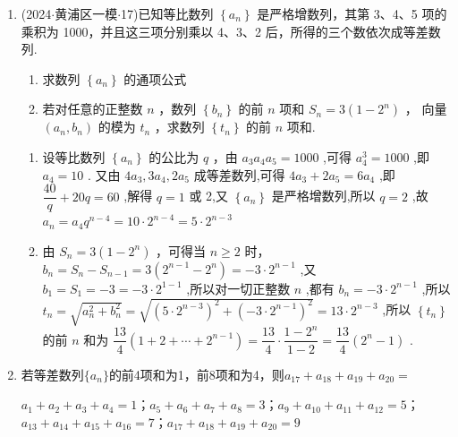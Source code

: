 \begin{enumerate}
\begin{jieda}
        要使 $\dfrac{{a}_n}{b_n}$ 为整数,则 $n + 1$ 为 24 的因数,由于 $n + 1 \geq  2$ ,故 $n + 1$ 可以为2,3,4,6,8,12,24,故满足条件的正整数 $n$ 的个数为 7 个
    \end{jieda}

    \item (2024$\cdot$黄浦区一模$\cdot$17)已知等比数列 $\left\{  {a}_{n}\right\}$ 是严格增数列，其第 3、4、5 项的乘积为 1000，并且这三项分别乘以 4、3、2 后，所得的三个数依次成等差数列.
    \begin{enumerate}
        \item 求数列 $\left\{  {a}_{n}\right\}$ 的通项公式
        \item 若对任意的正整数 $n$ ，数列 $\left\{  {b}_{n}\right\}$ 的前 $n$ 项和 ${S}_{n} = 3\left( {1 - {2}^{n}}\right)$ ， 向量 $\left( {{a}_{n},{b}_{n}}\right)$ 的模为 ${t}_{n}$ ，求数列 $\left\{  {t}_{n}\right\}$ 的前 $n$ 项和.
    \end{enumerate}
    \begin{jieda}
        \begin{enumerate}
            \item 设等比数列 $\left\{  {a}_{n}\right\}$ 的公比为 $q$ ，由 ${a}_{3}{a}_{4}{a}_{5} = {1000}$ ,可得 ${a}_{4}^{3} = {1000}$ ,即 ${a}_{4} = {10}$ . 又由 $4{a}_{3},3{a}_{4},2{a}_{5}$ 成等差数列,可得 $4{a}_{3} + 2{a}_{5} = 6{a}_{4}$ ,即 $\dfrac{40}{q} + {20q} = {60}$ ,解得 $q = 1$ 或 2,又 $\left\{  {a}_{n}\right\}$ 是严格增数列,所以 $q = 2$ ,故 ${a}_{n} = {a}_{4}{q}^{n - 4} =  {10} \cdot  {2}^{n - 4} = 5 \cdot  {2}^{n - 3}$
            \item 由 ${S}_{n} = 3\left( {1 - {2}^{n}}\right)$ ，可得当 $n \geq  2$ 时， ${b}_{n} = {S}_{n} - {S}_{n - 1} =  3\left( {{2}^{n - 1} - {2}^{n}}\right)  =  - 3 \cdot  {2}^{n - 1}$ ,又 ${b}_{1} = {S}_{1} =  - 3 =  - 3 \cdot  {2}^{1 - 1}$ ,所以对一切正整数 $n$ ,都有 ${b}_{n} =  - 3 \cdot  {2}^{n - 1}$ ,所以 ${t}_{n} = \sqrt{{a}_{n}^{2} + {b}_{n}^{2}} =  \sqrt{{\left( 5 \cdot  {2}^{n - 3}\right) }^{2} + {\left( -3 \cdot  {2}^{n - 1}\right) }^{2}} = {13} \cdot  {2}^{n - 3}$ ,所以 $\left\{  {t}_{n}\right\}$ 的前 $n$ 和为 $\dfrac{13}{4}\left( {1 + 2 + \cdots  + {2}^{n - 1}}\right)  = \dfrac{13}{4} \cdot  \dfrac{1 - {2}^{n}}{1 - 2} = \dfrac{13}{4}\left( {{2}^{n} - 1}\right)$ .
        \end{enumerate}
    \end{jieda}

    \item 若等差数列$\{a_n\}$的前4项和为1，前8项和为4，则$a_{17} + a_{18} +a_{19} +a_{20} = $
    \begin{jieda}
        $a_{1} + a_{2} +a_{3} +a_{4} = 1$；$a_{5} + a_{6} +a_{7} +a_{8} = 3$；$a_{9} + a_{10} +a_{11} +a_{12} = 5$；$a_{13} + a_{14} +a_{15} +a_{16} = 7$；$a_{17} + a_{18} +a_{19} +a_{20} = 9$
    \end{jieda}


\end{enumerate}
